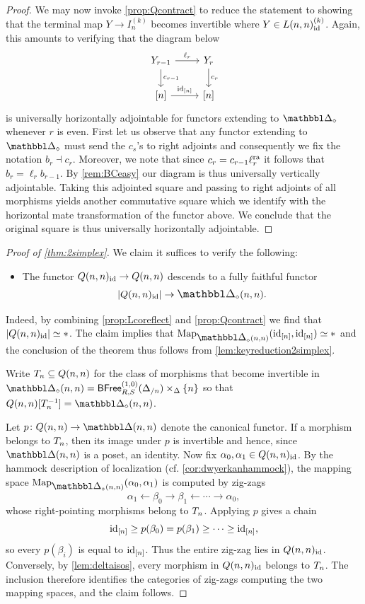 \documentclass[a4paper,reqno,twoside]{amsart}
\begin{document}
\begin{proof}
	
	We may now invoke \cref{prop:Qcontract} to reduce the statement to showing that the terminal map $Y \to I_n^{(k)}$ becomes invertible where $Y \in L(n,n)_{\mathrm{id}}^{(k)}$. Again, this amounts to verifying that the diagram below
	\[
		\begin{tikzcd}
			Y_{r-1} \arrow[r,"\ell_{r}"] \arrow[d,"c_{r-1}"] & Y_{r} \arrow[d,"c_{r}"] \\
			{[n]} \arrow[r,"\id_{[n]}"] & {[n]}
		\end{tikzcd}
	\] 
	is universally horizontally adjointable for functors extending to $\ddelta_\diamond$ whenever $r$ is even. First let us observe that any functor extending to $\ddelta_{\diamond}$ must send the $c_s$'s to right adjoints and consequently we fix the notation $b_{r}\dashv c_r$. Moreover, we note that since $c_r=c_{r-1}\ell^{\mathrm{ra}}_r$ it follows that $b_{r}=\ell_r b_{r-1}$. By \cref{rem:BCeasy} our diagram is thus universally vertically adjointable. Taking this adjointed square and passing to right adjoints of all morphisms yields another commutative square which we identify with the horizontal mate transformation of the functor above. We conclude that the original square is thus universally horizontally adjointable.
\end{proof}
\medskip
\begin{proof}[Proof of \cref{thm:2simplex}]
 We claim it suffices to verify the following:
 \begin{itemize}
	\item[$(\star)$] The functor $Q(n,n)_{\mathrm{id}} \to Q(n,n)$ descends to a fully faithful functor 
	\[
		|Q(n,n)_{\id}| \to \ddelta_{\diamond}(n,n).
	\]
 \end{itemize}
 Indeed, by combining \cref{prop:Lcoreflect} and \cref{prop:Qcontract} we find that $|Q(n,n)_{\mathrm{id}}| \simeq \ast$. The claim implies that $\Map_{\ddelta_{\diamond}(n,n)}(\id_{[n]},\id_{[n]})\simeq \ast$ and the conclusion of the theorem thus follows from \cref{lem:keyreduction2simplex}.


Write $\relax{T}_n \subseteq Q(n,n)$ for the class of morphisms that become invertible in $\ddelta_{\diamond}(n,n)=\BFree^{(1,0)}_{R,S}(\Delta_{/n})\times_\Delta \{n\}$ so that $Q(n,n)[\cT_n^{-1}]=\ddelta_{\diamond}(n,n)$.

	Let $p\colon Q(n,n)\to\ddelta(n,n)$ denote the canonical functor. If a morphism belongs to $\relax{T}_n$, then its image under $p$ is invertible and hence, since $\ddelta(n,n)$ is a poset, an identity. Now fix $\alpha_0,\alpha_1\in Q(n,n)_{\mathrm{id}}$. By the hammock description of localization (cf. \cref{cor:dwyerkanhammock}), the mapping space $\Map_{\ddelta_{\diamond}(n,n)}(\alpha_0,\alpha_1)$ is computed by zig-zags
	\[
		\alpha_1 \xleftarrow{} \beta_0 \xrightarrow{} \beta_1 \xleftarrow{} \cdots \xrightarrow{}\alpha_0,
	\]
	whose right-pointing morphisms belong to $\relax{T}_n$. Applying $p$ gives a chain
	\[
		\mathrm{id}_{[n]}\geq p(\beta_0)=p(\beta_1)\geq\cdots\geq\mathrm{id}_{[n]},
	\]
	so every $p(\beta_i)$ is equal to $\mathrm{id}_{[n]}$. Thus the entire zig-zag lies in $Q(n,n)_{\mathrm{id}}$. Conversely, by \cref{lem:deltaisos}, every morphism in $Q(n,n)_{\mathrm{id}}$ belongs to $\relax{T}_n$. The inclusion therefore identifies the categories of zig-zags computing the two mapping spaces, and the claim follows.
\end{proof}
\end{document}
